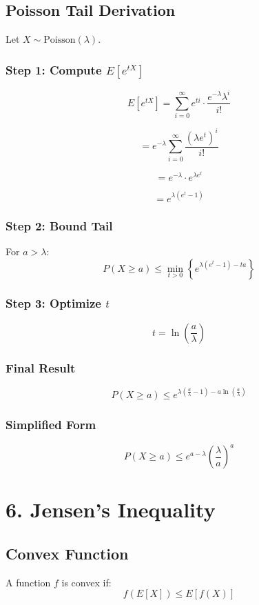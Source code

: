 \documentclass{article}
\begin{document}
\subsection*{Poisson Tail Derivation}

Let $X \sim \text{Poisson}(\lambda)$.

\subsubsection*{Step 1: Compute $E[e^{tX}]$}
\[
E[e^{tX}] = \sum_{i=0}^{\infty} e^{ti} \cdot \frac{e^{-\lambda} \lambda^i}{i!}
\]

\[
= e^{-\lambda} \sum_{i=0}^{\infty} \frac{(\lambda e^t)^i}{i!}
\]

\[
= e^{-\lambda} \cdot e^{\lambda e^t}
\]

\[
= e^{\lambda(e^t - 1)}
\]

\subsubsection*{Step 2: Bound Tail}
For $a > \lambda$:
\[
P(X \ge a) \le \min_{t > 0} \left\{ e^{\lambda(e^t - 1) - ta} \right\}
\]

\subsubsection*{Step 3: Optimize $t$}
\[
t = \ln\left(\frac{a}{\lambda}\right)
\]

\subsubsection*{Final Result}
\[
P(X \ge a) \le e^{\lambda\left(\frac{a}{\lambda} - 1\right) - a \ln\left(\frac{a}{\lambda}\right)}
\]

\subsubsection*{Simplified Form}
\[
P(X \ge a) \le e^{a - \lambda} \left(\frac{\lambda}{a}\right)^a
\]

\section*{6. Jensen's Inequality}

\subsection*{Convex Function}
A function $f$ is convex if:
\[
f(E[X]) \le E[f(X)]
\]
\end{document}
